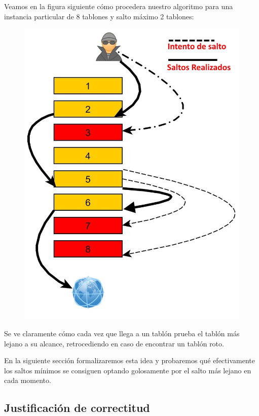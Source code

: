 Veamos en la figura siguiente cómo procedera nuestro algoritmo para una instancia particular de 8 tablones y salto máximo 2 tablones:

\begin{figure}[H]
\centering
\includegraphics[scale=0.32]{ej1/unnamed0.jpg}
\end{figure}

Se ve claramente cómo cada vez que llega a un tablón prueba el tablón más lejano a su alcance, retrocediendo en caso de encontrar un tablón roto. 

En la siguiente sección formalizaremos esta idea y probaremos qué efectivamente los saltos mínimos se consiguen optando golosamente por el salto más lejano en cada momento.


\subsection{Justificaci\'on de correctitud}

